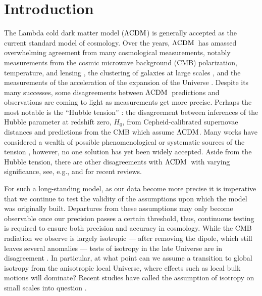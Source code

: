 \documentclass[fleqn,usenatbib]{mnras}
\newcommand{\lcdm}{$\Lambda\rm{CDM}$} %
\begin{document}


\section{Introduction}

The Lambda {cold dark matter} model (\lcdm) is generally accepted as the current standard model of cosmology.
Over the years, \lcdm\ has amassed overwhelming agreement from many {cosmological} measurements, notably measurements from the {cosmic microwave background (CMB)} polarization, temperature, and lensing \citep{Planck2018}, 
the {clustering} of galaxies at large scales \citep[e.g.][]{DESY3_cosmo}, and the measurements of the acceleration of the expansion of the Universe \citep{Riess1998,Perlmutter1999}.
Despite its many successes, %
some disagreements between \lcdm\ predictions and observations {are coming to light as measurements get more precise}. Perhaps the most notable is the ``Hubble tension'' \citep{Riess_2016}{:} the disagreement between inferences of the Hubble parameter {at redshift zero}, $H_0$, from Cepheid-calibrated supernovae {distances} %
and predictions from the CMB {which assume \lcdm}. %
{Many works have considered a wealth of} possible phenomenological or systematic sources of the tension %
\citep[see, e.g.][]{Di_Valentino_2021, Efstathiou_2021, Mortsell2018}{, however, no one solution has yet been widely accepted. Aside from the Hubble tension, there are other disagreements with %
\lcdm\ with varying significance}, 
see, e.g., \citet{abdalla2022cosmology} {and \citet{Aluri2022}} for recent reviews.


For such a long-standing model, as our data become more precise it is imperative {that} we continue to test the validity of the assumptions {upon which the model was originally built. Departures from these assumptions may only become observable once our precision passes a certain threshold, thus, continuous testing is required to ensure both precision and accuracy in cosmology. } %
{While the CMB radiation we observe is largely isotropic --- after removing the dipole, which still leaves several anomalies \citep[see, e.g.][]{Schwarz:2016} --- tests of isotropy in the late Universe are in disagreement \citep[e.g.][]{Ripa2017,Javanmardi2017,Alonso_2015,Gibelyou_2012}. }
In particular, at what point can we assume a transition to global isotropy from the anisotropic local Universe, 
{where effects such as local bulk motions will dominate}? {Recent studies have called the assumption of isotropy on small scales into question \citep[e.g.][]{Colin_2011}.}
\end{document}

